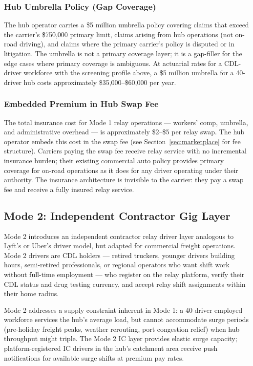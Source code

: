 \subsubsection*{Hub Umbrella Policy (Gap Coverage)}

The hub operator carries a \$5 million umbrella policy covering claims that exceed the carrier's \$750,000 primary limit, claims arising from hub operations (not on-road driving), and claims where the primary carrier's policy is disputed or in litigation. The umbrella is not a primary coverage layer; it is a gap-filler for the edge cases where primary coverage is ambiguous. At actuarial rates for a CDL-driver workforce with the screening profile above, a \$5 million umbrella for a 40-driver hub costs approximately \$35,000--\$60,000 per year.

\subsubsection*{Embedded Premium in Hub Swap Fee}

The total insurance cost for Mode 1 relay operations --- workers' comp, umbrella, and administrative overhead --- is approximately \$2--\$5 per relay swap. The hub operator embeds this cost in the swap fee (see Section~\ref{sec:marketplace} for fee structure). Carriers paying the swap fee receive relay service with no incremental insurance burden; their existing commercial auto policy provides primary coverage for on-road operations as it does for any driver operating under their authority. The insurance architecture is invisible to the carrier: they pay a swap fee and receive a fully insured relay service.

\subsection{Mode 2: Independent Contractor Gig Layer}

Mode 2 introduces an independent contractor relay driver layer analogous to Lyft's or Uber's driver model, but adapted for commercial freight operations. Mode 2 drivers are CDL holders --- retired truckers, younger drivers building hours, semi-retired professionals, or regional operators who want shift work without full-time employment --- who register on the relay platform, verify their CDL status and drug testing currency, and accept relay shift assignments within their home radius.

Mode 2 addresses a supply constraint inherent in Mode 1: a 40-driver employed workforce services the hub's average load, but cannot accommodate surge periods (pre-holiday freight peaks, weather rerouting, port congestion relief) when hub throughput might triple. The Mode 2 IC layer provides elastic surge capacity; platform-registered IC drivers in the hub's catchment area receive push notifications for available surge shifts at premium pay rates.

